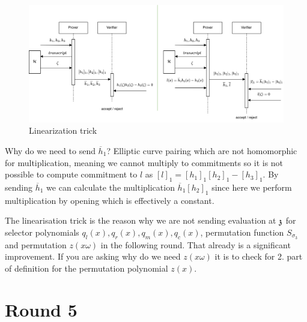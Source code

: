 \begin{figure}[H]
    \centering
    \includegraphics[width=1\linewidth]{round-figures/round4/linearisation_trick.drawio.png}
    \caption{Linearization trick}
\end{figure}

Why do we need to send $\overline{h}_1$?
Elliptic curve pairing which are not homomorphic for multiplication, meaning we cannot multiply to commitments so it is not possible to compute commitment to $l$ as $[l]_1 = [h_1]_1[h_2]_1 - [h_3]_1$. By sending $\overline{h}_1$ we can calculate the multiplication $\overline{h}_1[h_2]_1$ since here we perform multiplication by opening which is effectively a constant.

The linearisation trick is the reason why we are not sending evaluation at $\mathfrak{z}$ for selector polynomials $q_l(x), q_r(x), q_m(x), q_c(x)$, permutation function $S_{\sigma_3}$ and permutation $z(x\omega)$ in the following round. That already is a significant improvement. If you are asking why do we need $z(x\omega)$ it is to check for 2. part of definition for the permutation polynomial $z(x)$.


\section{Round 5}
\label{chap:round5}

